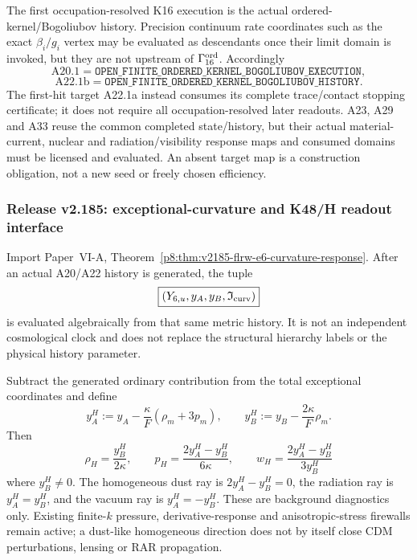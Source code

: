 \documentclass[12pt,a4paper]{article}
\begin{document}
\begin{corollary}
\label{p9:cor:v2178-a20-a22-execution}
The first occupation-resolved K16 execution is the actual ordered-kernel/Bogoliubov
history.  Precision continuum rate coordinates such as the exact
$\beta_i/g_i$ vertex may be evaluated as descendants once their limit domain
is invoked, but they are not upstream of $\Gamma_{16}^{\rm ord}$.
Accordingly
\[
 \boxed{\mathrm{A20.1}
 =\texttt{OPEN\_FINITE\_ORDERED\_KERNEL\_BOGOLIUBOV\_EXECUTION}},
\]
\[
 \boxed{\mathrm{A22.1b}
 =\texttt{OPEN\_FINITE\_ORDERED\_KERNEL\_BOGOLIUBOV\_HISTORY}}.
\]
The first-hit target A22.1a instead consumes its complete trace/contact
stopping certificate; it does not require all occupation-resolved later
readouts.  A23, A29 and A33 reuse the common completed state/history, but their
actual material-current, nuclear and radiation/visibility response maps and
consumed domains must be licensed and evaluated.  An absent target map is a
construction obligation, not a new seed or freely chosen efficiency.
\end{corollary}

\subsubsection{Release v2.185: exceptional-curvature and K48/H readout interface}
\label{p9:sec:v2185-c06-e6-readout}

\begin{corollary}
\label{p9:cor:v2185-c06-e6-readout}
Import Paper~VI-A, Theorem~\ref{p8:thm:v2185-flrw-e6-curvature-response}.
After an actual A20/A22 history is generated, the tuple
\[
 \boxed{(Y_{6,u},y_A,y_B,\mathfrak I_{\rm curv})}
\]
is evaluated algebraically from that same metric history.  It is not an
independent cosmological clock and does not replace the structural hierarchy
labels or the physical history parameter.
\end{corollary}

\begin{corollary}
\label{p9:cor:v2185-h-response-e6-direction}
Subtract the generated ordinary contribution from the total exceptional
coordinates and define
\[
 y_A^H:=y_A-\frac{\kappa}{F}(\rho_m+3p_m),\qquad
 y_B^H:=y_B-\frac{2\kappa}{F}\rho_m.
\]
Then
\[
 \boxed{\rho_H=\frac{y_B^H}{2\kappa},\qquad
 p_H=\frac{2y_A^H-y_B^H}{6\kappa},\qquad
 w_H=\frac{2y_A^H-y_B^H}{3y_B^H}}
\]
where $y_B^H\ne0$.  The homogeneous dust ray is
$2y_A^H-y_B^H=0$, the radiation ray is $y_A^H=y_B^H$, and the vacuum ray is
$y_A^H=-y_B^H$.  These are background diagnostics only.  Existing finite-$k$
pressure, derivative-response and anisotropic-stress firewalls remain active;
a dust-like homogeneous direction does not by itself close CDM perturbations,
lensing or RAR propagation.
\end{corollary}
\end{document}
